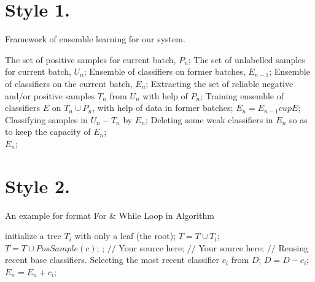\documentclass[UTF8]{article}
\begin{document}
\section{Style 1.}

\begin{algorithm}[htb]

\caption{Framework of ensemble learning for our system.}
\label{alg:Framwork}
\begin{algorithmic}[1]
\Require
The set of positive samples for current batch, $P_n$;
The set of unlabelled samples for current batch, $U_n$;
Ensemble of classifiers on former batches, $E_{n-1}$;
\Ensure
Ensemble of classifiers on the current batch, $E_n$;
\State Extracting the set of reliable negative and/or positive samples $T_n$ from $U_n$ with help of $P_n$;
\label{code:fram:extract}
\State Training ensemble of classifiers $E$ on $T_n \cup P_n$, with help of data in former batches;
\label{code:fram:trainbase}
\State $E_n=E_{n-1}cup E$;
\label{code:fram:add}
\State Classifying samples in $U_n-T_n$ by $E_n$;
\label{code:fram:classify}
\State Deleting some weak classifiers in $E_n$ so as to keep the capacity of $E_n$;
\label{code:fram:select} \\
\Return $E_n$;
\end{algorithmic}
\end{algorithm}


\section{Style 2.}

\begin{algorithm}[h]
\caption{An example for format For \& While Loop in Algorithm}
\begin{algorithmic}[1]
\State initialize a tree $T_{i}$ with only a leaf (the root);
\State $T=T\cup T_{i};$
\EndFor
{}
\label{code:TrainBase:getc}
\State $T=T\cup PosSample(c)$;
\label{code:TrainBase:pos}
\EndFor;
\State $//$ Your source here;
\EndFor
{}
\State $//$ Your source here;
\EndFor
\State $//$ Reusing recent base classifiers.
\label{code:recentStart}
\State Selecting the most recent classifier $c_i$ from $D$;
\State $D=D-c_i$;
\State $E_n=E_n+c_i$;
\EndWhile
\label{code:recentEnd}
\end{algorithmic}
\end{algorithm}
\end{document}
